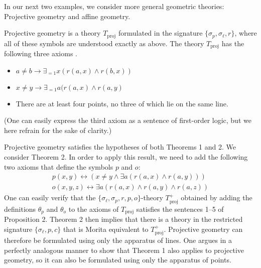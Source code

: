 In our next two examples, we consider more general geometric theories:
Projective geometry and affine geometry.

\begin{example}
  Projective geometry is a theory $T_\text{proj}$ formulated in the
  signature $\{\sigma_p, \sigma_\ell, r\}$, where all of these symbols
  are understood exactly as above. The theory $T_\text{proj}$ has the
  following three axioms \citep{barnes1975}.
\begin{itemize}
\item $a\neq b\rightarrow \exists_{=1}x (r(a,x)\land r(b,x))$ 
\item $x\neq y\rightarrow \exists_{=1}a (r(a,x)\land r(a, y)$ 
\item There are at least four points, no three of which lie on the same line.
\end{itemize}
(One can easily express the third axiom as a sentence of first-order logic, but we here refrain for the sake of clarity.)

Projective geometry satisfies the hypotheses of both Theorems 1 and
2. We consider Theorem 2. In order to apply this result, we need to
add the following two axioms that define the symbols $p$ and $o$:
\begin{align}
p(x,y)\leftrightarrow (x\neq y\land \exists a(r(a,x)\land r(a,y)))
\tag{$\theta_p$}\\
o(x,y,z)\leftrightarrow\exists a(r(a,x)\land r(a,y)\land r(a, z))
\tag{$\theta_o$}
\end{align}
One can easily verify that the
$\{\sigma_\ell, \sigma_p, r, p, o\}$-theory $T_\text{proj}^+$ obtained
by adding the definitions $\theta_p$ and $\theta_o$ to the axioms of
$T_\text{proj}$ satisfies the sentences 1--5 of Proposition 2. Theorem
2 then implies that there is a theory in the restricted signature
$\{\sigma_\ell, p, c\}$ that is Morita equivalent to
$T_\text{proj}^+$. Projective geometry can therefore be formulated
using only the apparatus of lines. One argues in a perfectly analogous
manner to show that Theorem 1 also applies to projective geometry, so
it can also be formulated using only the apparatus of points.
\end{example}


